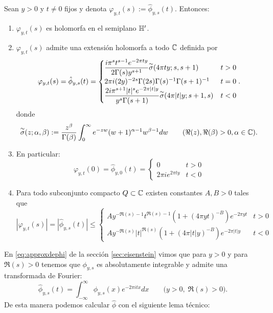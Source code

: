 \begin{prop}\label{ap:de_phihat}
  Sean $y>0$ y $t\neq0$ fijos y denota $\varphi_{y,t}(s):=\hat{\phi}_{y,s}(t)$. Entonces:
  \begin{enumerate}[label=\roman*)]
  \item $\varphi_{y,t}(s)$ es holomorfa en el semiplano $\mathbb{H}'$.
  \item $\varphi_{y,t}(s)$ admite una extensi\'on holomorfa a todo $\mathbb{C}$ definida por
    \begin{equation}\label{ap:formulaphihat}
      \varphi_{y,t}(s)=\hat{\phi}_{y,s}(t)=
      \begin{cases}
        \dfrac{i\pi^st^{s-1}e^{-2\pi ty}}{2\Gamma(s)y^{s+1}}\overset{\sim}{\sigma}(4\pi ty;s,s+1) &t>0\\
        2\pi i(2y)^{-2s}\Gamma(2s)\Gamma(s)^{-1}\Gamma(s+1)^{-1} &t=0\\
        \dfrac{2i\pi^{s+1}|t|^se^{-2\pi|t|y}}{y^s\Gamma(s+1)}\overset{\sim}{\sigma}(4\pi|t|y;s+1,s) &t<0
      \end{cases}.
    \end{equation}
    donde
    \[
      \overset{\sim}{\sigma}(z;\alpha,\beta):=\frac{z^{\beta}}{\Gamma(\beta)}\int_0^{\infty}e^{-zw}(w+1)^{\alpha-1}w^{\beta-1}dw
  \qquad(\Re(z),\Re(\beta)>0,\alpha\in\mathbb{C}).
    \]
  \item\label{ap:inciso3} En particular:
    \[
      \varphi_{y,t}(0)=\hat{\phi}_{y,0}(t)=
      \begin{cases}
        0 & t>0\\
        2\pi i e^{2\pi ty} &t<0
      \end{cases}
    \]
  \item\label{ap:inciso4} Para todo subconjunto compacto $Q\subset\mathbb{C}$ existen constantes $A,B>0$
    tales que
    \[
      |\varphi_{y,t}(s)|=|\hat{\phi}_{y,s}(t)|\leq
      \begin{cases}
        A y^{-\Re(s)-1}t^{\Re(s)-1}(1+(4\pi yt)^{-B})e^{-2\pi yt} & t>0\\
        A y^{-\Re(s)}|t|^{\Re(s)}(1+(4\pi |t|y)^{-B})e^{-2\pi|t|y} & t<0
      \end{cases}
    \]
  \end{enumerate}
\end{prop}

En \eqref{eq:approxdephi} de la secci\'on \ref{sec:eisenstein} vimos que para $y>0$ y para
$\Re(s)>0$ tenemos que $\phi_{y,s}$ es absolutamente integrable y admite una transformada de Fourier:
\begin{equation}
  \label{ap:phihat}
  \hat{\phi}_{y,s}(t)=\int_{-\infty}^{\infty}\phi_{y,s}(x)e^{-2\pi i tx}dx
  \qquad \big(y>0,\; \Re(s)>0\big).
\end{equation}
De esta manera podemos calcular $\hat{\phi}$ con el siguiente lema t\'ecnico:

